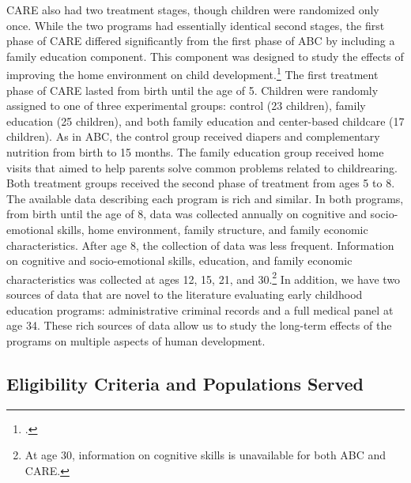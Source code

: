 \noindent  CARE also had two treatment stages, though children were randomized only once. While the two programs had essentially identical second stages, the first phase of CARE differed significantly from the first phase of ABC by including a family education component. This component was designed to study the effects of improving the home environment on child development.\footnote{\citet{Wasik_Ramey_etal_1990_CD}.} The first treatment phase of CARE lasted from birth until the age of 5. Children were randomly assigned to one of three experimental groups: control (23 children), family education (25 children), and both family education and center-based childcare (17 children). As in ABC, the control group received diapers and complementary nutrition from birth to 15 months. The family education group received home visits that aimed to help parents solve common problems related to childrearing. Both treatment groups received the second phase of treatment from ages 5 to 8.\\

\noindent The available data describing each program is rich and similar. In both programs, from birth until the age of 8, data was collected annually on cognitive and socio-emotional skills, home environment, family structure, and family economic characteristics. After age 8, the collection of data was less frequent. Information on cognitive and socio-emotional skills, education, and family economic characteristics was collected at ages 12, 15, 21, and 30.\footnote{At age 30, information on cognitive skills is unavailable for both ABC and CARE.} In addition, we have two sources of data that are novel to the literature evaluating early childhood education programs: administrative criminal records and a full medical panel at age 34. These rich sources of data allow us to study the long-term effects of the programs on multiple aspects of human development.

\subsection{Eligibility Criteria and Populations Served} \label{section:eligibility}

